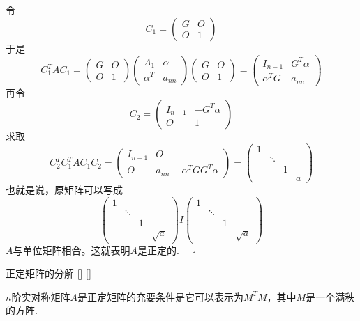 \documentclass[UTF8]{ctexart}
\begin{document}
\begin{prf}
			\noindent 令\[ C_1=\begin{pmatrix}
				G&O\\O&1
			\end{pmatrix}
			\]
			于是\[
			C_1^TAC_1=\begin{pmatrix}
				G&O\\O&1
			\end{pmatrix} \begin{pmatrix}
				A_1&\alpha\\\alpha^T&a_{nn}
			\end{pmatrix}\begin{pmatrix}
				G&O\\O&1
			\end{pmatrix}=\begin{pmatrix}
				I_{n-1}&G^T\alpha\\\alpha^TG&a_{nn}
			\end{pmatrix}\]
			再令\[ C_2=\begin{pmatrix}
				I_{n-1}&-G^T\alpha\\O&1
			\end{pmatrix} \]
			求取\[ C_2^TC_1^TAC_1C_2=
			\begin{pmatrix}
				I_{n-1}&O\\O&a_{nn}-\alpha^TGG^T\alpha
			\end{pmatrix}=\begin{pmatrix}
				1&&&\\ &\ddots&&\\ &&1&\\ &&&a
			\end{pmatrix}\]
			也就是说，原矩阵可以写成\[\begin{pmatrix}
				1&&&\\ &\ddots&&\\ &&1&\\ &&&\sqrt{a}
			\end{pmatrix}I\begin{pmatrix}
				1&&&\\ &\ddots&&\\ &&1&\\ &&&\sqrt{a}
			\end{pmatrix}
			\]
			$A$与单位矩阵相合。这就表明$A$是正定的. $\quad\square$
		\end{prf}

		\begin{thm}
			[]
			{正定矩阵的分解}
			[]
			[]
			
			$n$阶实对称矩阵$A$是正定矩阵的充要条件是它可以表示为$M^TM$，其中$M$是一个满秩的方阵.
		\end{thm}
\end{document}
